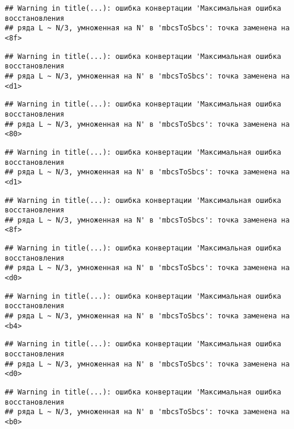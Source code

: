 \documentclass[
]{article}
\begin{document}
\begin{verbatim}
## Warning in title(...): ошибка конвертации 'Максимальная ошибка восстановления
## ряда L ~ N/3, умноженная на N' в 'mbcsToSbcs': точка заменена на <8f>
\end{verbatim}

\begin{verbatim}
## Warning in title(...): ошибка конвертации 'Максимальная ошибка восстановления
## ряда L ~ N/3, умноженная на N' в 'mbcsToSbcs': точка заменена на <d1>
\end{verbatim}

\begin{verbatim}
## Warning in title(...): ошибка конвертации 'Максимальная ошибка восстановления
## ряда L ~ N/3, умноженная на N' в 'mbcsToSbcs': точка заменена на <80>
\end{verbatim}

\begin{verbatim}
## Warning in title(...): ошибка конвертации 'Максимальная ошибка восстановления
## ряда L ~ N/3, умноженная на N' в 'mbcsToSbcs': точка заменена на <d1>
\end{verbatim}

\begin{verbatim}
## Warning in title(...): ошибка конвертации 'Максимальная ошибка восстановления
## ряда L ~ N/3, умноженная на N' в 'mbcsToSbcs': точка заменена на <8f>
\end{verbatim}

\begin{verbatim}
## Warning in title(...): ошибка конвертации 'Максимальная ошибка восстановления
## ряда L ~ N/3, умноженная на N' в 'mbcsToSbcs': точка заменена на <d0>
\end{verbatim}

\begin{verbatim}
## Warning in title(...): ошибка конвертации 'Максимальная ошибка восстановления
## ряда L ~ N/3, умноженная на N' в 'mbcsToSbcs': точка заменена на <b4>
\end{verbatim}

\begin{verbatim}
## Warning in title(...): ошибка конвертации 'Максимальная ошибка восстановления
## ряда L ~ N/3, умноженная на N' в 'mbcsToSbcs': точка заменена на <d0>
\end{verbatim}

\begin{verbatim}
## Warning in title(...): ошибка конвертации 'Максимальная ошибка восстановления
## ряда L ~ N/3, умноженная на N' в 'mbcsToSbcs': точка заменена на <b0>
\end{verbatim}
\end{document}
